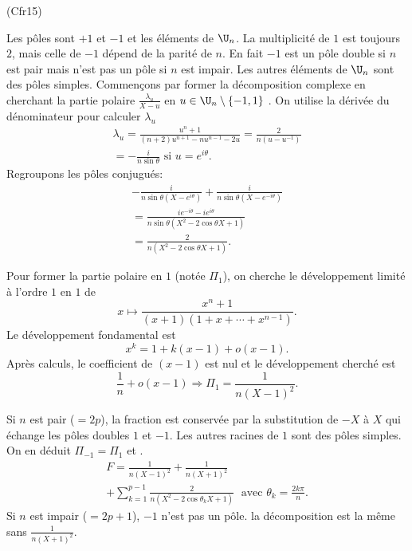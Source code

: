 \begin{tiny}(Cfr15)\end{tiny} Les pôles sont $+1$ et $-1$ et les éléments de $\U_n$. La multiplicité de $1$ est toujours $2$, mais celle de $-1$ dépend de la parité de $n$. En fait $-1$ est un pôle double si $n$ est pair mais n'est pas un pôle si $n$ est impair. Les autres éléments de $\U_n$ sont des pôles simples.\newline
Commençons par former la décomposition complexe en cherchant la partie polaire $\frac{\lambda_u}{X-u}$ en $u \in \U_n \setminus \lbrace -1, 1\rbrace$ . On utilise la dérivée du dénominateur pour calculer $\lambda_u$
\begin{multline*}
  \lambda_u = \frac{u^n + 1}{(n+2)u^{n+1}- nu^{n-1} - 2u}
  = \frac{2}{n(u - u^{-1})}\\
  = -  \frac{i}{n\sin \theta} \text{ si } u = e^{i \theta}.
\end{multline*}
Regroupons les pôles conjugués:
\begin{multline*}
  -  \frac{i}{n\sin \theta(X-e^{i\theta})}  + \frac{i}{n\sin \theta(X-e^{-i\theta}) } \\
  = \frac{ie^{-i\theta} - ie^{i\theta}}{n\sin \theta(X^2 - 2\cos \theta X + 1)}\\
  = \frac{2}{n(X^2 - 2\cos \theta X + 1)}.
\end{multline*}

Pour former la partie polaire en $1$ (notée $\Pi_1$), on cherche le développement limité à l'ordre $1$ en $1$
de
\[
  x \mapsto \frac{x^n + 1}{(x+1)(1+x+\cdots +x^{n-1})}.
\]
Le développement fondamental est 
\[
  x^k = 1 + k(x-1) + o(x-1).
\]
Après calculs, le coefficient de $(x-1)$ est nul et le développement cherché est
\[
  \frac{1}{n} + o(x-1)
  \Rightarrow \Pi_1 = \frac{1}{n(X-1)^2}.
\]

Si $n$ est pair ($ = 2p$), la fraction est conservée par la substitution de $-X$ à $X$ qui échange les pôles doubles $1$ et $-1$. Les autres racines de $1$ sont des pôles simples. On en déduit $\Pi_{-1} = \Pi_1$ et .
\begin{multline*}
  F = \frac{1}{n(X-1)^2} + \frac{1}{n(X+1)^2} \\ 
  + \sum_{k=1}^{p-1}\frac{2}{n(X^2 - 2\cos \theta_k X + 1)}
  \; \text{ avec } \theta_k = \frac{2 k \pi}{n}.
\end{multline*}
Si $n$ est impair ($ = 2p+1$), $-1$ n'est pas un pôle. la décomposition est la même sans $\frac{1}{n(X+1)^2}$. 
